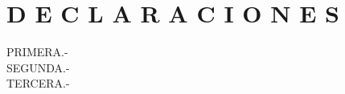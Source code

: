 \section*{D E C L A R A C I O N E S}
\begin{description}
    \item[PRIMERA.-] \lipsum[1]
    \item[SEGUNDA.-] \lipsum[2]
    \item[TERCERA.-] \lipsum[3]
\end{description}